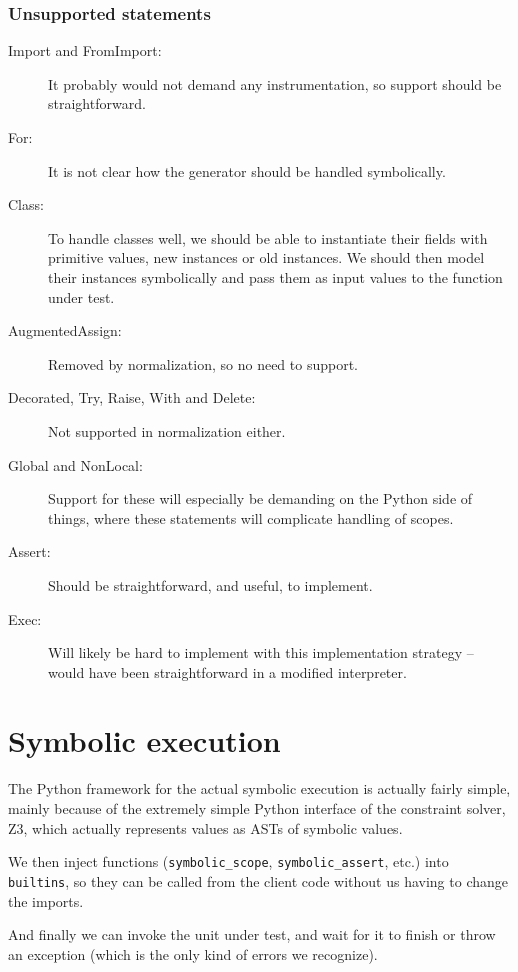 \documentclass[11pt]{report}
\begin{document}
\begin{description}
\subsection{Unsupported statements}
\begin{description}
  \item[Import and FromImport:] It probably would not demand any
    instrumentation, so support should be straightforward.
  \item[For:] It is not clear how the generator should be handled
    symbolically.
  \item[Class:] To handle classes well, we should be able to
    instantiate their fields with primitive values, new instances or
    old instances. We should then model their instances symbolically
    and pass them as input values to the function under
    test. \cite{Pasareanu:2010}
  \item[AugmentedAssign:] Removed by normalization, so no need to
    support.
  \item[Decorated, Try, Raise, With and Delete:] Not supported in
    normalization either.
  \item[Global and NonLocal:] Support for these will especially be
    demanding on the Python side of things, where these statements
    will complicate handling of scopes.
  \item[Assert:] Should be straightforward, and useful, to implement.
  \item[Exec:] Will likely be hard to implement with this
    implementation strategy -- would have been straightforward in a
    modified interpreter.
\end{description}


\chapter{Symbolic execution}
\label{ch:symbolic}

The Python framework for the actual symbolic execution is actually
fairly simple, mainly because of the extremely simple Python interface
of the constraint solver, Z3, which actually represents values as ASTs
of symbolic values.

We then inject functions (\verb|symbolic_scope|, \verb|symbolic_assert|,
etc.) into \texttt{builtins}, so they can be called from the client
code without us having to change the imports.

And finally we can invoke the unit under test, and wait for it to
finish or throw an exception (which is the only kind of errors we
recognize).


\end{description}
\end{document}
